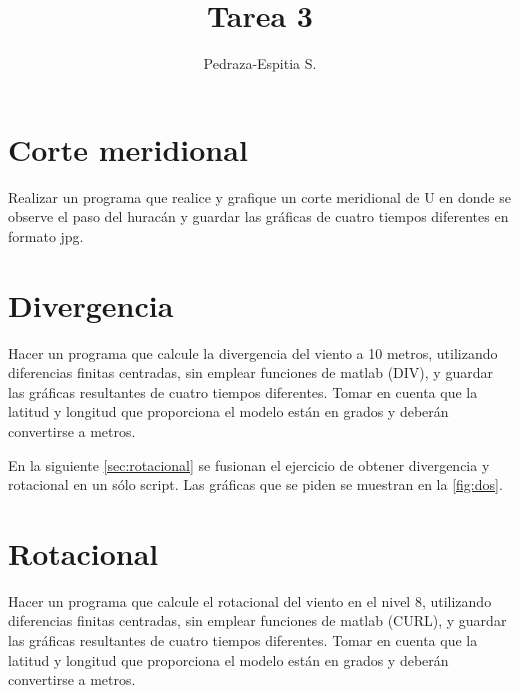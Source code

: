 \documentclass{article}
\title{Tarea 3}
\author{Pedraza-Espitia S.}
\date{}
\begin{document}
\maketitle

\section{Corte meridional}
Realizar un programa que realice y grafique un corte meridional de U en donde se observe el
paso del huracán y guardar las gráficas de cuatro tiempos diferentes en formato jpg.





\section{Divergencia}
Hacer un programa que calcule la divergencia del viento a 10 metros, utilizando diferencias
finitas centradas, sin emplear funciones de matlab (DIV), y guardar las gráficas resultantes de
cuatro tiempos diferentes. Tomar en cuenta que la latitud y longitud que proporciona el
modelo están en grados y deberán convertirse a metros.

En la siguiente \autoref{sec:rotacional} se fusionan el ejercicio de obtener
divergencia y rotacional en un s\'olo script.
Las gr\'aficas que se piden se muestran en la \autoref{fig:dos}.


\section{Rotacional}\label{sec:rotacional}
Hacer un programa que calcule el rotacional del viento en el nivel 8, utilizando diferencias
finitas centradas, sin emplear funciones de matlab (CURL), y guardar las gráficas resultantes
de cuatro tiempos diferentes. Tomar en cuenta que la latitud y longitud que proporciona el
modelo están en grados y deberán convertirse a metros.


\FloatBarrier
\end{document}
